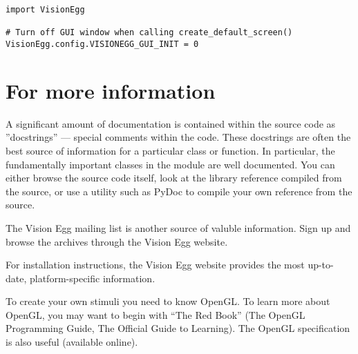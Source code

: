 \documentclass{manual}
\begin{document}
\begin{verbatim}
import VisionEgg

# Turn off GUI window when calling create_default_screen()
VisionEgg.config.VISIONEGG_GUI_INIT = 0
\end{verbatim}

\section{For more information}

A significant amount of documentation is contained within the source
code as ''docstrings'' --- special comments within the code.  These
docstrings are often the best source of information for a particular
class or function. In particular, the fundamentally important classes
in the  module are well documented.  You can
either browse the source code itself, look at the library reference
compiled from the source, or use a utility such as PyDoc to compile
your own reference from the source.

The Vision Egg mailing list is another source of valuble information.
Sign up and browse the archives through the Vision Egg website.

For installation instructions, the Vision Egg website provides the
most up-to-date, platform-specific information.

To create your own stimuli you need to know OpenGL.  To learn more
about OpenGL, you may want to begin with ``The Red Book'' (The OpenGL
Programming Guide, The Official Guide to Learning).  The OpenGL
specification is also useful (available online).


\end{document}
